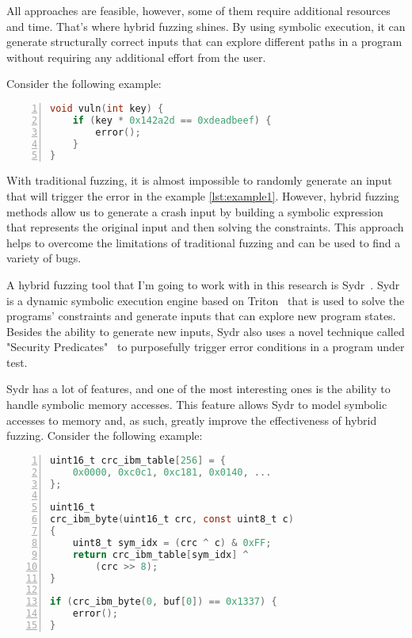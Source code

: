 \documentclass[conference]{IEEEtran}
\begin{document}
All approaches are feasible, however, some of them require additional resources and time. That's where hybrid fuzzing shines. By using symbolic execution, it can generate structurally correct inputs that can explore different paths in a program without requiring any additional effort from the user.

Consider the following example:

\begin{lstlisting}[caption={Example solvable by hybrid fuzzing},label={lst:example1},language=C, basicstyle=\small\ttfamily, numbers=left, xleftmargin=2em, breaklines=true, captionpos=b]
void vuln(int key) {
    if (key * 0x142a2d == 0xdeadbeef) {
        error();
    }
}
\end{lstlisting}


With traditional fuzzing, it is almost impossible to randomly generate an input that will trigger the error in the example \ref{lst:example1}. However, hybrid fuzzing methods allow us to generate a crash input by building a symbolic expression that represents the original input and then solving the constraints. This approach helps to overcome the limitations of traditional fuzzing and can be used to find a variety of bugs.

A hybrid fuzzing tool that I'm going to work with in this research is Sydr~\cite{sydr-cutting-edge-dynamic-symbolic-execution}. Sydr is a dynamic symbolic execution engine based on Triton~\cite{saudel15} that is used to solve the programs' constraints and generate inputs that can explore new program states. Besides the ability to generate new inputs, Sydr also uses a novel technique called {"Security Predicates"}~\cite{symbolic-security-predicates} to purposefully trigger error conditions in a program under test.

Sydr has a lot of features, and one of the most interesting ones is the ability to handle symbolic memory accesses. This feature allows Sydr to model symbolic accesses to memory and, as such, greatly improve the effectiveness of hybrid fuzzing. Consider the following example:

\begin{lstlisting}[caption={Access to memory via a symbolic pointer},label={lst:example2},language=C, basicstyle=\small\ttfamily, numbers=left, xleftmargin=2em, breaklines=true, captionpos=b]
uint16_t crc_ibm_table[256] = { 
    0x0000, 0xc0c1, 0xc181, 0x0140, ...
};

uint16_t
crc_ibm_byte(uint16_t crc, const uint8_t c)
{
    uint8_t sym_idx = (crc ^ c) & 0xFF;
    return crc_ibm_table[sym_idx] ^ 
        (crc >> 8);
}

if (crc_ibm_byte(0, buf[0]) == 0x1337) {
    error();
}
\end{lstlisting}
\end{document}
